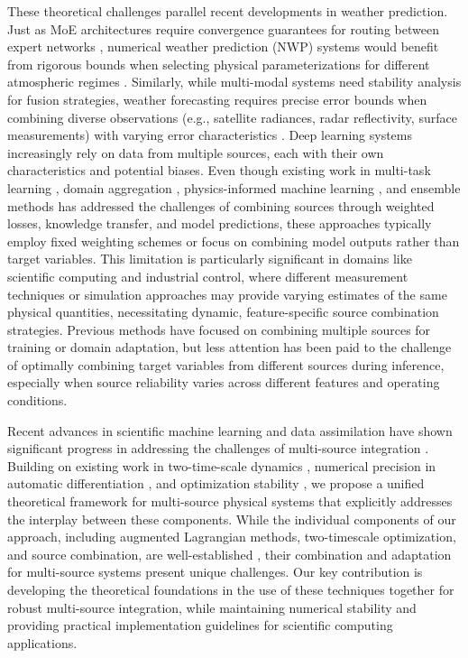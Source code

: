 \documentclass[preprint,12pt,authoryear]{elsarticle}
\begin{document}
These theoretical challenges parallel recent developments in weather prediction. Just as MoE architectures require convergence guarantees for routing between expert networks \cite{yang2023theoretical}, numerical weather prediction (NWP) systems would benefit from rigorous bounds when selecting physical parameterizations for different atmospheric regimes \cite{reich2023data}. Similarly, while multi-modal systems need stability analysis for fusion strategies, weather forecasting requires precise error bounds when combining diverse observations (e.g., satellite radiances, radar reflectivity, surface measurements) with varying error characteristics \cite{carrassi2023data}.
Deep learning systems increasingly rely on data from multiple sources, each with their own characteristics and potential biases. Even though existing work in multi-task learning \cite{kendall2018multi}, domain aggregation \cite{wang2020learning}, physics-informed machine learning \cite{schmidt2024algorithm}, and ensemble methods \cite{dietterich2000ensemble} has addressed the challenges of combining sources through weighted losses, knowledge transfer, and model predictions, these approaches typically employ fixed weighting schemes or focus on combining model outputs rather than target variables. This limitation is particularly significant in domains like scientific computing and industrial control, where different measurement techniques or simulation approaches may provide varying estimates of the same physical quantities, necessitating dynamic, feature-specific source combination strategies. Previous methods \cite{zhao2018adversarial, peng2019moment} have focused on combining multiple sources for training or domain adaptation, but less attention has been paid to the challenge of optimally combining target variables from different sources during inference, especially when source reliability varies across different features and operating conditions.

Recent advances in scientific machine learning and data assimilation have shown significant progress in addressing the challenges of multi-source integration \cite{ brunton2022data, kochkov2021machine, prakash2023multi, matsubara2022deep}. Building on existing work in two-time-scale dynamics \cite{Marion2023Leveraging}, numerical precision in automatic differentiation \cite{xu2023automatic}, and optimization stability \cite{higham2023numerical}, we propose a unified theoretical framework for multi-source physical systems that explicitly addresses the interplay between these components. While the individual components of our approach, including augmented Lagrangian methods, two-timescale optimization, and source combination, are well-established \cite{pathak2015constrained, cotter2019optimization, lu2021physics}, their combination and adaptation for multi-source systems present unique challenges. Our key contribution is developing the theoretical foundations in the use of these techniques together for robust multi-source integration, while maintaining numerical stability and providing practical implementation guidelines for scientific computing applications.
\end{document}
